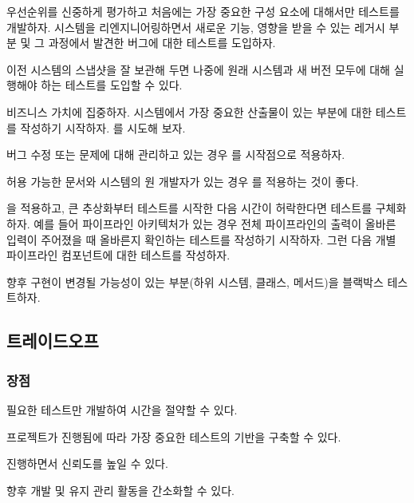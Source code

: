 \documentclass[a4paper,10pt,twoside]{book}
\begin{document}
\begin{bulletlist}
\item 우선순위를 신중하게 평가하고 처음에는 가장 중요한 구성 요소에 대해서만 테스트를 개발하자. 시스템을 리엔지니어링하면서 새로운 기능, 영향을 받을 수 있는 레거시 부분 및 그 과정에서 발견한 버그에 대한 테스트를 도입하자. 
\item 이전 시스템의 스냅샷을 잘 보관해 두면 나중에 원래 시스템과 새 버전 모두에 대해 실행해야 하는 테스트를 도입할 수 있다.
\item 비즈니스 가치에 집중하자. 시스템에서 가장 중요한 산출물이 있는 부분에 대한 테스트를 작성하기 시작하자. 를 시도해 보자.
\item 버그 수정 또는 문제에 대해 관리하고 있는 경우 를 시작점으로 적용하자.
\item 허용 가능한 문서와 시스템의 원 개발자가 있는 경우 를 적용하는 것이 좋다.
\item {}을 적용하고, 큰 추상화부터 테스트를 시작한 다음 시간이 허락한다면 테스트를 구체화하자. 예를 들어 파이프라인 아키텍처가 있는 경우 전체 파이프라인의 출력이 올바른 입력이 주어졌을 때 올바른지 확인하는 테스트를 작성하기 시작하자. 그런 다음 개별 파이프라인 컴포넌트에 대한 테스트를 작성하자.
\item 향후 구현이 변경될 가능성이 있는 부분(하위 시스템, 클래스, 메서드)을 블랙박스 테스트하자.
\end{bulletlist}

\subsection*{트레이드오프}

\subsubsection*{장점}

\begin{bulletlist}
\item 필요한 테스트만 개발하여 시간을 절약할 수 있다.
\item 프로젝트가 진행됨에 따라 가장 중요한 테스트의 기반을 구축할 수 있다.
\item 진행하면서 신뢰도를 높일 수 있다.
\item 향후 개발 및 유지 관리 활동을 간소화할 수 있다.
\end{bulletlist}
\end{document}
